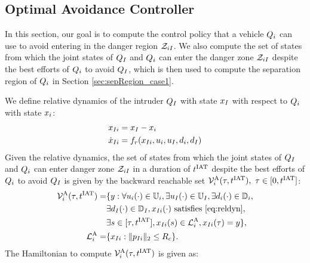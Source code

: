 \subsection{Optimal Avoidance Controller} \label{sec:intruder_avoid}
In this section, our goal is to compute the control policy that a vehicle $Q_i$ can use to avoid entering in the danger region $\mathcal{Z}_{iI}$. We also compute the set of states from which the joint states of $Q_{I}$ and $Q_i$ can enter the danger zone $\mathcal{Z}_{iI}$ despite the best efforts of $Q_i$ to avoid $Q_{I}$, which is then used to compute the separation region of $Q_i$ in Section \ref{sec:sepRegion_case1}. 

We define relative dynamics of the intruder $Q_{I}$ with state $x_I$ with respect to $Q_i$ with state $x_i$:
\begin{equation}
\label{eq:reldyn}
\begin{aligned}
\state_{\intr i} &= \state_\intr - \state_i \\
\dot \state_{\intr i} &= f_r(\state_{\intr i}, \ctrl_i, \ctrl_\intr, \dstb_i, \dstb_\intr)
\end{aligned}
\end{equation}
Given the relative dynamics, the set of states from which the joint states of $Q_{I}$ and $Q_{i}$ can enter danger zone $\mathcal{Z}_{iI}$ in a duration of $t^\text{IAT}$ despite the best efforts of $Q_i$ to avoid $Q_{I}$ is given by the backward reachable set $\mathcal{V}^{\text{A}}_i(\tau, t^\text{IAT}),~ \tau \in [0, t^\text{IAT}]$:
\begin{equation} \label{eqn:avoidBRS}
\begin{aligned}
\brs^{\text{A}}_{i}(\tau, \iat) = & \{y: \forall \ctrl_i(\cdot) \in \cfset_i, \exists \ctrl_\intr(\cdot) \in \cfset_\intr, \exists \dstb_i(\cdot) \in \dfset_i, \\
& \exists \dstb_\intr(\cdot) \in \dfset_\intr, \state_{\intr i}(\cdot) \text{ satisfies \eqref{eq:reldyn}},\\
& \exists s \in [\tau, \iat], \state_{\intr i}(s) \in \targetset^{\text{A}}_{i}, \state_{\intr i}(\tau) = y\},\\
\targetset^{\text{A}}_{i} = & \{\state_{\intr i}: \|\pos_{\intr i}\|_2 \le \rc\}.
\end{aligned}
\end{equation}
The Hamiltonian to compute $\mathcal{V}^{\text{A}}_{i}(\tau, t^\text{IAT})$ is given as:
